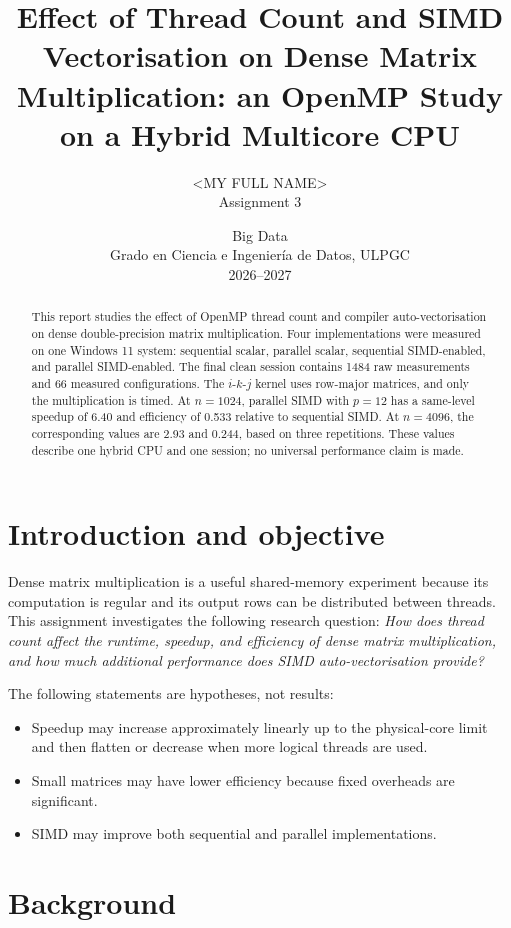 \documentclass[a4paper,11pt]{article}
\title{\textbf{Effect of Thread Count and SIMD Vectorisation on Dense Matrix
Multiplication: an OpenMP Study on a Hybrid Multicore CPU}}
\author{<MY FULL NAME>\\Assignment 3}
\date{Big Data\\Grado en Ciencia e Ingeniería de Datos, ULPGC\\2026--2027}
\begin{document}
\maketitle

\begin{abstract}
This report studies the effect of OpenMP thread count and compiler
auto-vectorisation on dense double-precision matrix multiplication. Four
implementations were measured on one Windows 11 system: sequential scalar,
parallel scalar, sequential SIMD-enabled, and parallel SIMD-enabled. The
final clean session contains 1484 raw measurements and 66 measured
configurations. The $i$-$k$-$j$ kernel uses row-major matrices, and only the
multiplication is timed. At $n=1024$, parallel SIMD with $p=12$ has a
same-level speedup of 6.40 and efficiency of 0.533 relative to sequential
SIMD. At $n=4096$, the corresponding values are 2.93 and 0.244, based on
three repetitions. These values describe one hybrid CPU and one session; no
universal performance claim is made.
\end{abstract}

\section{Introduction and objective}

Dense matrix multiplication is a useful shared-memory experiment because its
computation is regular and its output rows can be distributed between
threads. This assignment investigates the following research question:
\emph{How does thread count affect the runtime, speedup, and efficiency of
dense matrix multiplication, and how much additional performance does SIMD
auto-vectorisation provide?}

The following statements are hypotheses, not results:
\begin{itemize}
  \item Speedup may increase approximately linearly up to the physical-core
  limit and then flatten or decrease when more logical threads are used.
  \item Small matrices may have lower efficiency because fixed overheads are
  significant.
  \item SIMD may improve both sequential and parallel implementations.
\end{itemize}

\section{Background}
\end{document}
